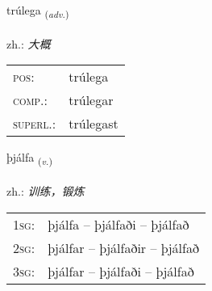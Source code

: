 \documentclass[frontgrid, backgrid]{flacards}\usepackage[]{graphicx}\usepackage[]{xcolor}
\begin{document}
\renewcommand{\flhead}{\vskip5pt \fboxsep=0pt {\small\bfseries\footnotesize Atviksorð | 副词}}
\renewcommand{\fcfoot}{\vskip5pt \fboxsep=0pt \hspace{2pt}{\small\bfseries\footnotesize 3K}}

\renewcommand{\blhead}{\vskip5pt {\small\bfseries\footnotesize Atviksorð | 副词 }}
\renewcommand{\bcfoot}{\vskip5pt \hspace{2pt}{\small\bfseries\footnotesize 3K}}


{trúlega \small{\textsubscript{(\textit{adv.})}} \\[1ex] %
\textphonetic{[tʰruːlɛɣa]} \\
zh.: \emph{大概} \\  [2ex]
\renewcommand*{\arraystretch}{0.8}
\begin{tabular}{ll}
\textsc{pos}: & trúlega \\ 
\textsc{comp.}: & trúlegar \\ 
\textsc{superl.}: & trúlegast \\
\end{tabular}
}

\renewcommand{\flhead}{\vskip5pt \fboxsep=0pt {\small\bfseries\footnotesize Sagnorð | 动词}}
\renewcommand{\fcfoot}{\vskip5pt \fboxsep=0pt \hspace{2pt}{\small\bfseries\footnotesize 3K}}

\renewcommand{\blhead}{\vskip5pt {\small\bfseries\footnotesize Sagnorð | 动词 }}
\renewcommand{\bcfoot}{\vskip5pt \hspace{2pt}{\small\bfseries\footnotesize 3K}}


{þjálfa \small{\textsubscript{(\textit{v.})}} \\[1ex] %
\textphonetic{[θjaulva]} \\
zh.: \emph{训练，锻炼} \\  [2ex]
\renewcommand*{\arraystretch}{0.8}
\begin{tabular}{p{1cm}l}
\textsc{1sg}: & þjálfa -- þjálfaði -- þjálfað \\ 
\textsc{2sg}: & þjálfar -- þjálfaðir -- þjálfað \\ 
\textsc{3sg}: & þjálfar -- þjálfaði -- þjálfað \\ 
\end{tabular}
}
\end{document}
